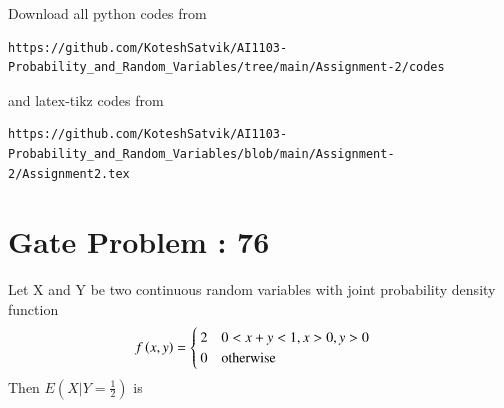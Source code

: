 \documentclass[journal,12pt,twocolumn]{IEEEtran}
\begin{document}
\author{Songa Kotesh Satvik}
\maketitle
\newpage
\bigskip
\renewcommand{\thefigure}{\theenumi}
\renewcommand{\thetable}{\theenumi}
Download all python codes from 
\begin{lstlisting}
https://github.com/KoteshSatvik/AI1103-Probability_and_Random_Variables/tree/main/Assignment-2/codes
\end{lstlisting}
%
and latex-tikz codes from 
%
\begin{lstlisting}
https://github.com/KoteshSatvik/AI1103-Probability_and_Random_Variables/blob/main/Assignment-2/Assignment2.tex
\end{lstlisting}
\section{ Gate Problem : 76 }
Let X and Y be two continuous random variables with joint probability density function \\
\begin{align}
f\left(x,y\right) &= 
  \begin{cases}
    2 & 0<x+y<1,x>0,y>0\\
    0 & \text{otherwise}\\
  \end{cases}
\end{align}
Then $E(X|Y=\frac{1}{2})$ is
\end{document}

